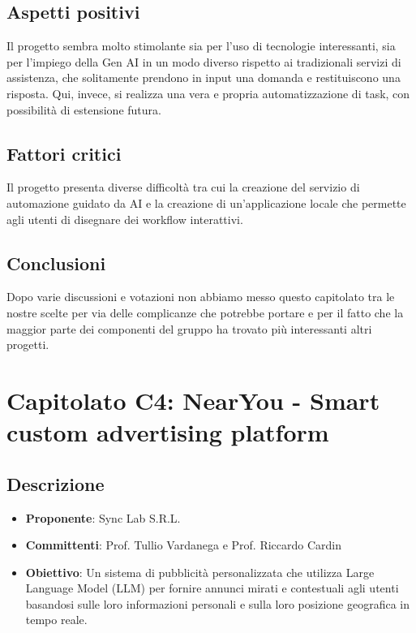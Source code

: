 \documentclass[italian, 12pt]{article}
\begin{document}
\subsection{Aspetti positivi}
Il progetto sembra molto stimolante sia per l'uso di tecnologie interessanti, sia per l'impiego della Gen AI in un modo diverso rispetto ai tradizionali servizi di assistenza, che solitamente prendono in input una domanda e restituiscono una risposta. Qui, invece, si realizza una vera e propria automatizzazione di task, con possibilità di estensione futura.

\subsection{Fattori critici}
Il progetto presenta diverse difficoltà tra cui la creazione del servizio di automazione guidato da AI e la creazione di un'applicazione locale che permette agli utenti di disegnare dei workflow interattivi.

\subsection{Conclusioni}
Dopo varie discussioni e votazioni non abbiamo messo questo capitolato tra le nostre scelte per via delle complicanze che potrebbe portare e per il fatto che la maggior parte dei componenti del gruppo ha trovato più interessanti altri progetti.

\section{Capitolato C4: NearYou - Smart custom advertising platform}
\subsection{Descrizione}
\begin{itemize}
\item\textbf{Proponente}: Sync Lab S.R.L.
\item\textbf{Committenti}: Prof. Tullio Vardanega e Prof. Riccardo Cardin
\item\textbf{Obiettivo}: Un sistema di pubblicità personalizzata che utilizza Large Language Model (LLM) per fornire annunci mirati e contestuali agli utenti basandosi sulle loro informazioni personali e sulla loro posizione geografica in tempo reale.
\end{itemize}
\end{document}
